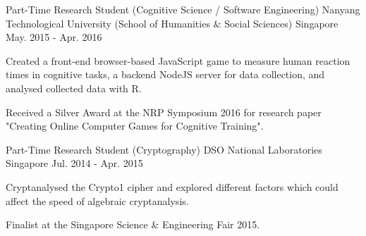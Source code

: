 \begin{cventries}
  \cventry
    {Part-Time Research Student (Cognitive Science / Software Engineering)} %
    {Nanyang Technological University (School of Humanities \& Social Sciences)} %
    {Singapore} %
    {May. 2015 - Apr. 2016} %
    {
      \begin{cvitems} %
        \item {Created a front-end browser-based JavaScript game to measure human reaction times in cognitive tasks, a backend NodeJS server for data collection, and analysed collected data with R.}
        \item {Received a Silver Award at the NRP Symposium 2016 for research paper "Creating Online Computer Games for Cognitive Training".}
      \end{cvitems}
    }

  \cventry
    {Part-Time Research Student (Cryptography)} %
    {DSO National Laboratories} %
    {Singapore} %
    {Jul. 2014 - Apr. 2015} %
    {
      \begin{cvitems} %
        \item {Cryptanalysed the Crypto1 cipher and explored different factors which could affect the speed of algebraic cryptanalysis.}
        \item {Finalist at the Singapore Science \& Engineering Fair 2015.}
      \end{cvitems}
    }
\end{cventries}
